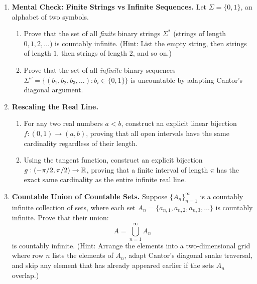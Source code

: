 \begin{enumerate}
\item \textbf{Mental Check: Finite Strings vs Infinite Sequences.}
Let $\Sigma = \{0, 1\}$, an alphabet of two symbols.
\begin{enumerate}[label=(\alph*)]
\item Prove that the set of all \emph{finite} binary strings $\Sigma^*$ (strings of length $0, 1, 2, \dots$) is countably infinite. (Hint: List the empty string, then strings of length $1$, then strings of length $2$, and so on.)
\item Prove that the set of all \emph{infinite} binary sequences $\Sigma^\omega = \{(b_1, b_2, b_3, \dots) : b_i \in \{0, 1\}\}$ is uncountable by adapting Cantor's diagonal argument.
\end{enumerate}

\item \textbf{Rescaling the Real Line.}
\begin{enumerate}[label=(\alph*)]
\item For any two real numbers $a < b$, construct an explicit linear bijection $f: (0, 1) \to (a, b)$, proving that all open intervals have the same cardinality regardless of their length.
\item Using the tangent function, construct an explicit bijection $g: (-\pi/2, \pi/2) \to \mathbb{R}$, proving that a finite interval of length $\pi$ has the exact same cardinality as the entire infinite real line.
\end{enumerate}

\item \textbf{Countable Union of Countable Sets.}
Suppose $\{A_n\}_{n=1}^\infty$ is a countably infinite collection of sets, where each set $A_n = \{a_{n,1}, a_{n,2}, a_{n,3}, \dots\}$ is countably infinite. Prove that their union:
\[
A = \bigcup_{n=1}^\infty A_n
\]
is countably infinite. (Hint: Arrange the elements into a two-dimensional grid where row $n$ lists the elements of $A_n$, adapt Cantor's diagonal snake traversal, and skip any element that has already appeared earlier if the sets $A_n$ overlap.)


\end{enumerate}
